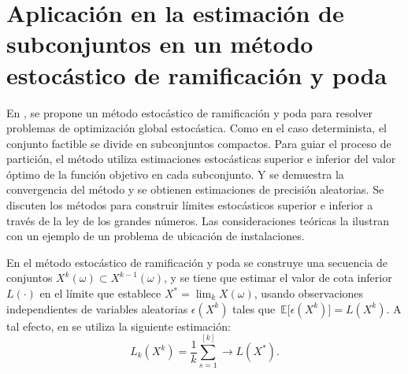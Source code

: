 \documentclass{article}
\newcommand\espe[1]{\, \mathbb{E} \lbrack #1 \rbrack}
\begin{document}
\section{Aplicación en la estimación de subconjuntos en un método estocástico de ramificación y poda } 
 En \cite{norkin1998branch}, se propone un método estocástico de ramificación y poda para resolver problemas de optimización global estocástica. Como en el caso determinista, el conjunto factible se divide en subconjuntos compactos. Para guiar el proceso de partición, el método utiliza estimaciones estocásticas superior e inferior del valor óptimo de la función objetivo en cada subconjunto. Y se demuestra la convergencia del método y se obtienen estimaciones de precisión aleatorias. Se discuten los métodos para construir límites estocásticos superior e inferior a través de la ley de los grandes números. Las consideraciones teóricas la ilustran con un ejemplo de un problema de ubicación de instalaciones.
 
En el método estocástico de ramificación y poda \cite{norkin1998branch} se construye una secuencia de conjuntos $X^{k}(\omega) \subset X^{k-1}(\omega)$, y se tiene que estimar el valor de cota inferior $L(\cdot)$ en el límite que establece $X^{\ast} =\lim_k X(\omega)$, usando observaciones independientes de variables aleatorias $\epsilon (X^k)$ tales que $\espe{\epsilon (X^k)}=L(X^{k})$. A tal efecto, en\cite{norkin1998branch} se utiliza la siguiente estimación:
\begin{equation}
    L_k(X^k)= \frac{1}{k}\sum_{s=1}^[k] \to L(X^{\ast}).
\end{equation}
\newpage


\end{document}
